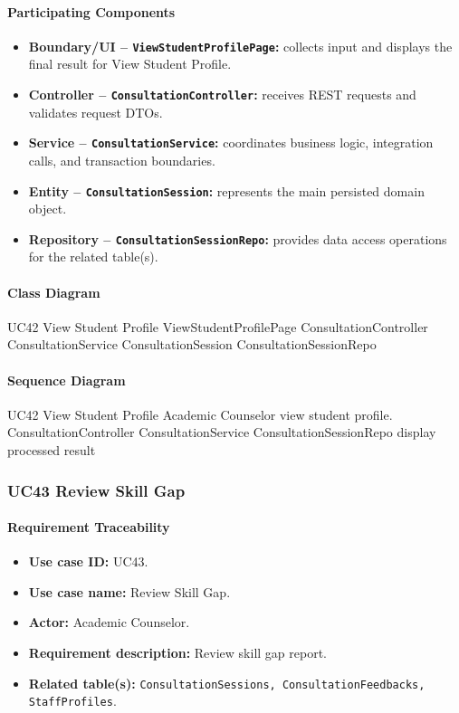 \paragraph{Participating Components}

\begin{itemize}
    \item \textbf{Boundary/UI -- \texttt{ViewStudentProfilePage}:} collects input and displays the final result for View Student Profile.
    \item \textbf{Controller -- \texttt{ConsultationController}:} receives REST requests and validates request DTOs.
    \item \textbf{Service -- \texttt{ConsultationService}:} coordinates business logic, integration calls, and transaction boundaries.
    \item \textbf{Entity -- \texttt{ConsultationSession}:} represents the main persisted domain object.
    \item \textbf{Repository -- \texttt{ConsultationSessionRepo}:} provides data access operations for the related table(s).
\end{itemize}

\paragraph{Class Diagram}

\ClassDiagram
{UC42 View Student Profile}
{ViewStudentProfilePage}
{ConsultationController}
{ConsultationService}
{ConsultationSession}
{ConsultationSessionRepo}

\paragraph{Sequence Diagram}

\SequenceDiagram
{UC42 View Student Profile}
{Academic Counselor}
{view student profile.}
{ConsultationController}
{ConsultationService}
{ConsultationSessionRepo}
{display processed result}

\subsubsection{UC43 Review Skill Gap}

\paragraph{Requirement Traceability}

\begin{itemize}
    \item \textbf{Use case ID:} UC43.
    \item \textbf{Use case name:} Review Skill Gap.
    \item \textbf{Actor:} Academic Counselor.
    \item \textbf{Requirement description:} Review skill gap report.
    \item \textbf{Related table(s):} \texttt{ConsultationSessions, ConsultationFeedbacks, StaffProfiles}.
\end{itemize}

